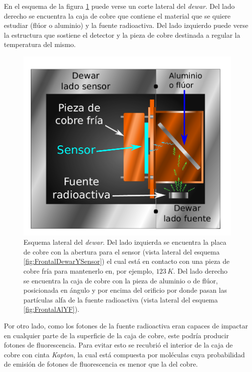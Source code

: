 En el esquema de la figura \ref{fig:LateralDewar} puede verse un corte lateral del \textit{dewar}. Del lado derecho se encuentra la caja de cobre que contiene el material que se quiere estudiar (flúor o aluminio) y la fuente radioactiva. Del lado izquierdo puede verse la estructura que sostiene el detector y la pieza de cobre destinada a regular la temperatura del mismo.
\begin{figure}%
    \centering
    \includegraphics[scale=0.7]{Figs/LateralDewar.pdf}
    \caption{\footnotesize{Esquema lateral del \textit{dewar}. Del lado izquierda se encuentra la placa de cobre con la abertura para el sensor (vista lateral del esquema \ref{fig:FrontalDewarYSensor}) el cual está en contacto con una pieza de cobre fría para mantenerlo en, por ejemplo, $123\,\si{K}$. Del lado derecho se encuentra la caja de cobre con la pieza de aluminio o de flúor, posicionada en ángulo y por encima del orificio por donde pasan las partículas alfa de la fuente radioactiva (vista lateral del esquema \ref{fig:FrontalAlYF}).}}
    \label{fig:LateralDewar}
\end{figure}
Por otro lado, como los fotones de la fuente radioactiva eran capaces de impactar en cualquier parte de la superficie de la caja de cobre, este podría producir fotones de fluorescencia. Para evitar esto se recubrió el interior de la caja de cobre con cinta \textit{Kapton}, la cual está compuesta por moléculas cuya probabilidad de emisión de fotones de fluorescencia es menor que la del cobre.
